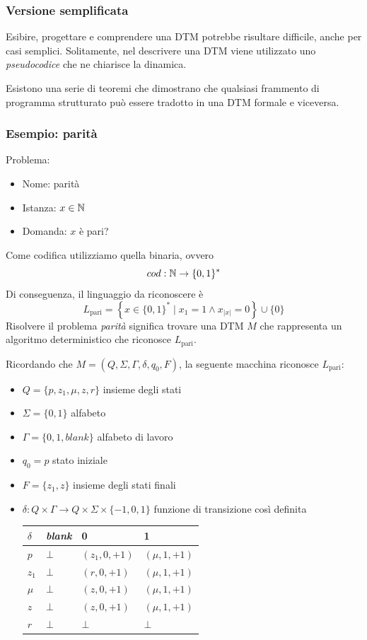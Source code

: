 \subsubsection{Versione semplificata}
Esibire, progettare e comprendere una DTM potrebbe risultare difficile, anche per casi semplici. Solitamente, nel descrivere una DTM viene utilizzato uno \textit{pseudocodice} che ne chiarisce la dinamica.

Esistono una serie di teoremi che dimostrano che qualsiasi frammento di programma strutturato può essere tradotto in una DTM formale e viceversa.

\subsubsection{Esempio: parità}
Problema: 
\begin{itemize}
	\item Nome: parità
	\item Istanza: $x \in \mathbb{N}$
	\item Domanda: $x$ è pari?
\end{itemize}

Come codifica utilizziamo quella binaria, ovvero
$$ cod: \mathbb{N} \rightarrow \{0,1\}^\ast $$
Di conseguenza, il linguaggio da riconoscere è 
$$ L_{\text{pari}} = \left\{x \in \{0,1\}^\ast \mid x_1 = 1 \wedge x_{|x|} = 0 \right\} \cup \{0\} $$
Risolvere il problema \textit{parità} significa trovare una DTM $M$ che rappresenta un algoritmo deterministico che riconosce $L_{\text{pari}}$.

Ricordando che $M = \left(Q, \Sigma, \Gamma, \delta, q_0, F\right)$, la seguente macchina riconosce $L_{\text{pari}}$:
\begin{itemize}
	\item $Q = \{p, z_1, \mu, z, r\}$ insieme degli stati
	\item $\Sigma = \{0,1\}$ alfabeto 
	\item $\Gamma = \{0,1, blank\}$ alfabeto di lavoro
	\item $q_0 = p$ stato iniziale
	\item $F = \{z_1, z\}$ insieme degli stati finali
	\item $\delta : Q \times \Gamma \rightarrow Q \times \Sigma \times \{-1, 0, 1\}$ funzione di transizione così definita
	\begin{center}
		\renewcommand{\arraystretch}{1.5}
		\begin{tabular}{| C{40000cm} | C{40000cm} | C{40000cm} | C{40000cm} |}
			\hline
			$\delta$ & \textit{blank} & 0 & 1 \\
			\hline
			$p$ & $\bot$ & $(z_1, 0, +1)$ & $(\mu, 1, +1)$ \\
			\hline
			$z_1$ & $\bot$ & $(r, 0, +1)$ & $(\mu, 1, +1)$ \\
			\hline
			$\mu$ & $\bot$ & $(z, 0, +1)$ & $(\mu, 1, +1)$ \\
			\hline
			$z$ & $\bot$ & $(z, 0, +1)$ & $(\mu, 1, +1)$ \\
			\hline
			$r$ & $\bot$ & $\bot$ & $\bot$ \\
			\hline
		\end{tabular}
	\end{center}
\end{itemize}

